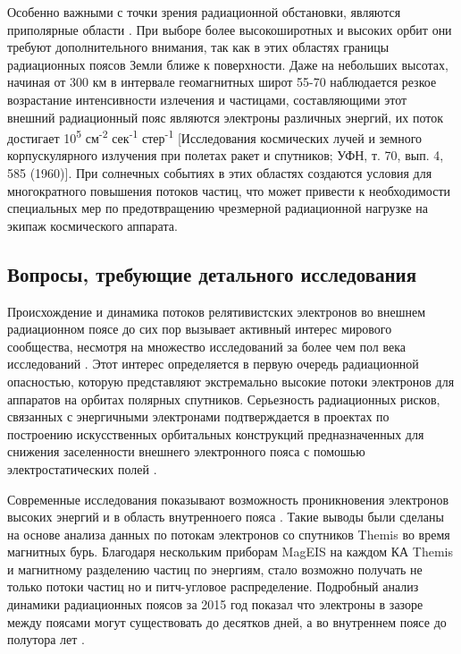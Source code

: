 Особенно важными с точки зрения радиационной обстановки, являются приполярные области \cite{gorchakov1961}. При выборе более высокоширотных и высоких орбит они требуют дополнительного внимания, так как в этих областях границы радиационных поясов Земли ближе к поверхности. Даже на небольших высотах, начиная от 300 км в интервале геомагнитных широт 55-70 наблюдается резкое возрастание интенсивности излечения и частицами, составляющими этот внешний радиационный пояс являются электроны различных энергий, их поток достигает 10\textsuperscript{5} см\textsuperscript{-2} сек\textsuperscript{-1} стер\textsuperscript{-1} [Исследования космических лучей и земного корпускулярного излучения при полетах ракет и спутников; УФН, т. 70, вып. 4, 585 (1960)]. При солнечных событиях в этих областях создаются условия для многократного повышения потоков частиц, что может привести к необходимости специальных мер по предотвращению чрезмерной радиационной нагрузке на экипаж космического аппарата.

\subsection{Вопросы, требующие детального исследования}
Происхождение и динамика потоков релятивистских электронов во внешнем радиационном поясе до сих пор вызывает активный интерес мирового сообщества, несмотря на множество исследований  за более чем пол века исследований \cite{Gussenhoven1997,Borovsky2010,Holeman1991,Miyoshi2011,Chen2016,Turner2013,Brautigam2001,Borovsky2010a,Gussenhoven1995,Borovsky2011,Baker2013,Mullen1998,Chen2014,Morley2010,Potapov2014,Denton2010}. Этот интерес определяется в первую очередь радиационной опасностью, которую представляют экстремально высокие потоки электронов для аппаратов на орбитах полярных спутников. Серьезность радиационных рисков, связанных с энергичными электронами подтверждается в проектах по построению искусственных орбитальных конструкций предназначенных для снижения заселенности внешнего электронного пояса с помошью электростатических полей \cite{Hoyt2007}.

Современные исследования показывают возможность проникновения электронов высоких энергий и в область внутренноего пояса \cite{Claudepierre2017}. Такие выводы были сделаны на основе анализа данных по потокам электронов со спутников Themis во время магнитных бурь. Благодаря нескольким приборам MagEIS  на каждом КА Themis и магнитному разделению частиц по энергиям, стало возможно получать не только потоки частиц но и питч-угловое распределение. Подробный анализ динамики радиационных поясов за 2015 год показал что электроны в зазоре между поясами могут существовать до десятков дней, а во внутреннем поясе до полутора лет \cite{Claudepierre2017}. 

